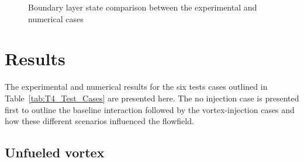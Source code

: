 \documentclass{AIAA}
\begin{document}
\begin{figure}[!h]
\center
{}
\caption{Boundary layer state comparison between the experimental and numerical cases}
\label{fig:Num_Exp_BLcompar}
\end{figure} 



\section{Results}

The experimental and numerical results for the six tests cases outlined in Table~\ref{tab:T4_Test_Cases} are presented here.
The no injection case is presented first to outline the baseline interaction followed by the vortex-injection cases and how these different scenarios influenced the flowfield.

\subsection{Unfueled vortex}
\end{document}
